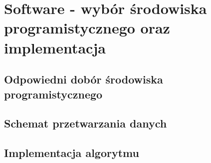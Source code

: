 \chapter{Software - wybór środowiska programistycznego oraz implementacja}
\label{cha:software}

\section{Odpowiedni dobór środowiska programistycznego}
\label{sec:IDE}

\section{Schemat przetwarzania danych}

\section{Implementacja algorytmu}